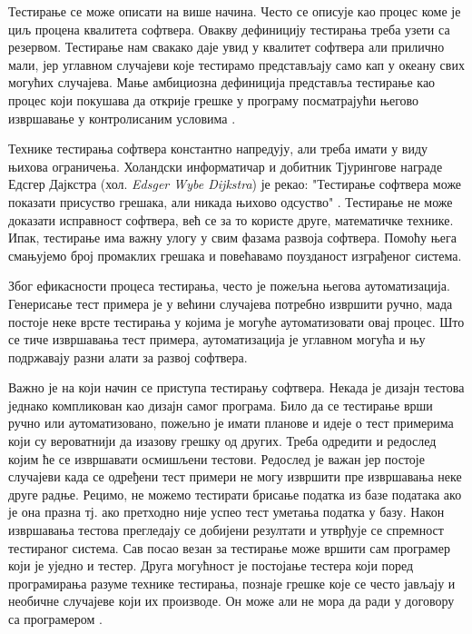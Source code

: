 \documentclass[12pt,oneside]{memoir}
\begin{document}
Тестирање се може описати на више начина. Често се описује као процес коме је циљ процена квалитета софтвера. Овакву дефиницију тестирања треба узети са резервом. Тестирање нам свакако даје увид у квалитет софтвера али прилично мали, јер углавном случајеви које тестирамо представљају само кап у океану свих могућих случајева. Мање амбициозна дефиниција представља тестирање као процес који покушава да открије грешке у програму посматрајући његово извршавање у контролисаним условима \cite{testPrinc}.

Технике тестирања софтвера константно напредују, али треба имати у виду њихова ограничења. Холандски информатичар и добитник Тјурингове награде Едсгер Дајкстра (хол. \textit{Edsger Wybe Dijkstra}) је рекао: "Тестирање софтвера може показати присуство грешака, али никада њихово одсуство" \cite{testPrinc}. Тестирање не може доказати исправност софтвера, већ се за то користе друге, математичке технике. Ипак, тестирање има важну улогу у свим фазама развоја софтвера. Помоћу њега смањујемо број промаклих грешака и повећавамо поузданост изграђеног система.

Због ефикасности процеса тестирања, често је пожељна његова аутоматизација. Генерисање тест примера је у већини случајева потребно извршити ручно, мада постоје неке врсте тестирања у којима је могуће аутоматизовати овај процес. Што се тиче извршавања тест примера, аутоматизација је углавном могућа и њу подржавају разни алати за развој софтвера.

Важно је на који начин се приступа тестирању софтвера. Некада је дизајн тестова једнако компликован као дизајн самог програма. Било да се тестирање врши ручно или аутоматизовано, пожељно је имати планове и идеје о тест примерима који су вероватнији да изазову грешку од других. Треба одредити и редослед којим ће се извршавати осмишљени тестови. Редослед је важан јер постоје случајеви када се одређени тест примери не могу извршити пре извршавања неке друге радње. Рецимо, не можемо тестирати брисање податка из базе података ако је она празна тј. ако претходно није успео тест уметања податка у базу. Након извршавања тестова прегледају се добијени резултати и утврђује се спремност тестираног система. Сав посао везан за тестирање може вршити сам програмер који је уједно и тестер. Друга могућност је постојање тестера који поред програмирања разуме технике тестирања, познаје грешке које се често јављају и необичне случајеве који их производе. Он може али не мора да ради у договору са програмером \cite{guideTestDesign, testMilena}.
\end{document}
